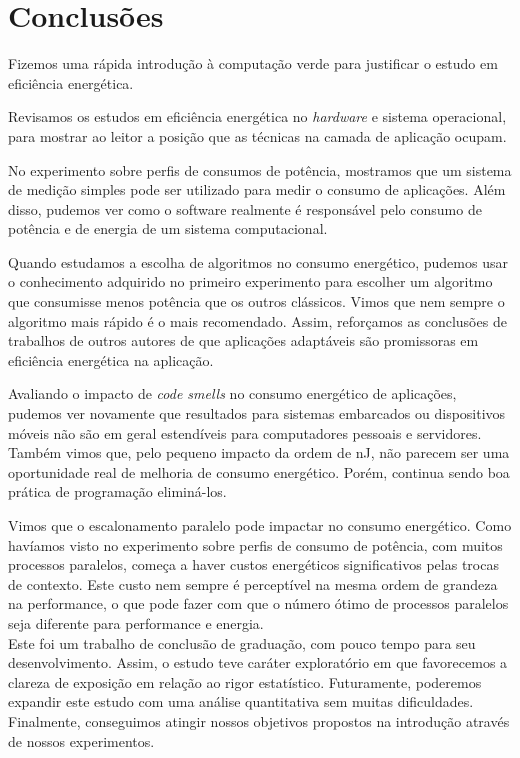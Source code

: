 \chapter{Conclusões}
\label{cap:conclusoes}

Fizemos uma rápida introdução à computação verde para justificar o estudo em eficiência energética. 

Revisamos os estudos em eficiência energética no \emph{hardware} e sistema operacional, para mostrar ao leitor a posição que as técnicas na camada de aplicação ocupam.

No experimento sobre perfis de consumos de potência, mostramos que um sistema de medição simples pode ser utilizado para medir o consumo de aplicações. Além disso, pudemos ver como o software realmente é responsável pelo consumo de potência e de energia de um sistema computacional. 

Quando estudamos a escolha de algoritmos no consumo energético, pudemos usar o conhecimento adquirido no primeiro experimento para escolher um algoritmo que consumisse menos potência que os outros clássicos. Vimos que nem sempre o algoritmo mais rápido é o mais recomendado. Assim, reforçamos as conclusões de trabalhos de outros autores de que aplicações adaptáveis são promissoras em eficiência energética na aplicação.

Avaliando o impacto de \emph{code smells} no consumo energético de aplicações, pudemos ver novamente que resultados para sistemas embarcados ou dispositivos móveis não são em geral estendíveis para computadores pessoais e servidores. Também vimos que, pelo pequeno impacto da ordem de nJ, não parecem ser uma oportunidade real de melhoria de consumo energético. Porém, continua sendo boa prática de programação eliminá-los.

Vimos que o escalonamento paralelo pode impactar no consumo energético. Como havíamos visto no experimento sobre perfis de consumo de potência, com muitos processos paralelos, começa a haver custos energéticos significativos pelas trocas de contexto. Este custo nem sempre é perceptível na mesma ordem de grandeza na performance, o que pode fazer com que o número ótimo de processos paralelos seja diferente para performance e energia.\\

Este foi um trabalho de conclusão de graduação, com pouco tempo para seu desenvolvimento. Assim, o estudo teve caráter exploratório em que favorecemos a clareza de exposição em relação ao rigor estatístico. Futuramente, poderemos expandir este estudo com uma análise quantitativa sem muitas dificuldades. Finalmente, conseguimos atingir nossos objetivos propostos na introdução através de nossos experimentos.